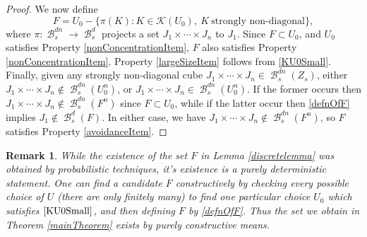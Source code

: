 \documentclass[dvipsnames,letterpaper,12pt]{article}
\numberwithin{equation}{section}
\theoremstyle{plain}
\newtheorem*{remark}{Remark}
\DeclareMathOperator{\B}{\mathcal{B}}
\begin{document}
\begin{proof}
	We now define 
	\begin{equation}\label{defnOfF}
		F = U_0 - \{ \pi(K)\colon K\in \mathcal{K}(U_0),\ K\ \textrm{strongly non-diagonal} \},
	\end{equation} 
	where $\pi\colon \B_s^{dn}\to \B_s^d$ projects a set $J_1\times\cdots\times J_n$ to $J_1$. Since $F\subset U_0$, and $U_0$ satisfies Property \ref{nonConcentrationItem}, $F$ also satisfies Property \ref{nonConcentrationItem}. Property \ref{largeSizeItem} follows from \eqref{KU0Small}. Finally, given any strongly non-diagonal cube $J_1 \times \cdots \times J_n \in \B_s^{dn}(Z_s)$, either $J_1 \times \cdots \times J_n \not \in \B_s^{dn}(U_0^n)$, or $J_1 \times \cdots \times J_n \in \B_s^{dn}(U_0^n)$. If the former occurs then $J_1 \times \cdots \times J_n \not \in \B_s^{dn}(F^n)$ since $F\subset U_0$, while if the latter occur then \eqref{defnOfF} implies $J_1 \not \in \B_s^d(F)$. In either case, we have $J_1 \times \cdots \times J_n \not \in \B_s^{dn}(F^n)$, so $F$ satisfies Property \ref{avoidanceItem}.
\end{proof}

\begin{remark}
	While the existence of the set $F$ in Lemma \ref{discretelemma} was obtained by probabilistic techniques, it's existence is a purely deterministic statement. One can find a candidate $F$ constructively by checking every possible choice of $U$ (there are only finitely many) to find one particular choice $U_0$ which satisfies $\eqref{KU0Small}$, and then defining $F$ by \eqref{defnOfF}.
	Thus the set we obtain in Theorem \ref{mainTheorem} exists by purely constructive means.
\end{remark}
\end{document}
